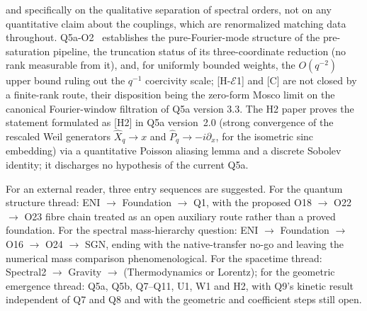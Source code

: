 \documentclass[11pt,a4paper]{article}
\begin{document}
  and specifically on the qualitative separation of spectral orders, not on any quantitative claim
  about the couplings, which are renormalized matching data throughout.
  Q5a-O2~\cite{Beau2026q5ao2} establishes the pure-Fourier-mode structure of the pre-saturation
  pipeline, the truncation status of its three-coordinate reduction (no rank measurable from
  it), and, for uniformly bounded weights, the $O(q^{-2})$ upper bound ruling out the $q^{-1}$
  coercivity scale; [H-$\mathcal{E}$1]
  and [C] are not closed by a finite-rank route, their disposition being the zero-form Mosco
  limit on the canonical Fourier-window filtration of Q5a version 3.3.
  The H2 paper proves the statement formulated as [H2] in Q5a version~2.0 (strong convergence of
  the rescaled Weil generators $\hat{X}_q \to x$ and $\hat{P}_q \to -i\partial_x$, for the isometric
  sinc embedding) via a quantitative Poisson aliasing lemma and a discrete Sobolev identity; it
  discharges no hypothesis of the current Q5a.

  For an external reader, three entry sequences are suggested.
  For the quantum structure thread:
  ENI $\to$ Foundation $\to$ Q1, with the proposed O18 $\to$ O22 $\to$ O23 fibre chain
  treated as an open auxiliary route rather than a proved foundation.
  For the spectral mass-hierarchy question:
  ENI $\to$ Foundation $\to$ O16 $\to$ O24 $\to$ SGN, ending with the native-transfer no-go
  and leaving the numerical mass comparison phenomenological.
  For the spacetime thread:
  Spectral2 $\to$ Gravity $\to$ (Thermodynamics or Lorentz);
  for the geometric emergence thread:
  Q5a, Q5b, Q7--Q11, U1, W1 and H2, with Q9's kinetic result independent of Q7 and Q8
  and with the geometric and coefficient steps still open.

  \clearpage
  
\end{document}
